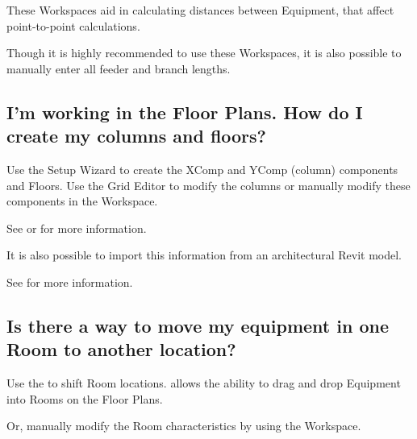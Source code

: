 \documentclass[letterpaper,10pt,english]{sphinxmanual}
\begin{document}
These Workspaces aid in calculating distances between Equipment, that affect point-to-point calculations.

Though it is highly recommended to use these Workspaces, it is also possible to manually enter all feeder and branch lengths.


\subsection{I’m working in the Floor Plans.  How do I create my columns and floors?}
\label{\detokenize{docs/faq:i-m-working-in-the-floor-plans-how-do-i-create-my-columns-and-floors}}
Use the Setup Wizard to create the XComp and YComp (column) components and Floors.  Use the Grid Editor to modify the columns or manually modify these components in the {\hyperref[\detokenize{docs/userguide/definingarchitecturalelements/archelements/index-arch-elements:arch-elements}]{}} Workspace.

See {\hyperref[\detokenize{docs/userguide/index-user_guide:floor-plans-overview}]{}} or {\hyperref[\detokenize{docs/userguide/definingarchitecturalelements/archelements/index-arch-elements:arch-elements}]{}} for more information.

It is also possible to import this information from an architectural Revit model.

See {\hyperref[\detokenize{docs/userguide/index-user_guide:revit-interoperability}]{}} for more information.


\subsection{Is there a way to move my equipment in one Room to another location?}
\label{\detokenize{docs/faq:is-there-a-way-to-move-my-equipment-in-one-room-to-another-location}}
Use the {\hyperref[\detokenize{docs/userguide/definingarchitecturalelements/floorplans/index-floor-plans:floor-plans}]{}} to shift Room locations.  {\hyperref[\detokenize{docs/userguide/definingarchitecturalelements/floorplans/index-floor-plans:floor-plans-move-equipment}]{}} allows the ability to drag and drop Equipment into Rooms on the Floor Plans.

Or, manually modify the Room characteristics by using the {\hyperref[\detokenize{docs/userguide/definingarchitecturalelements/archelements/index-arch-elements:arch-elements}]{}} Workspace.
\end{document}
